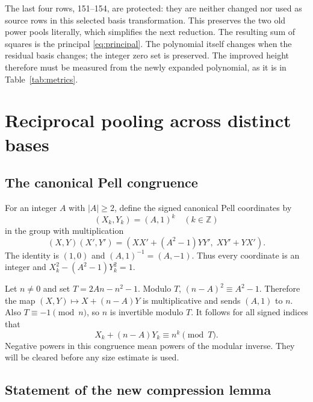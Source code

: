 \documentclass[11pt,letterpaper]{article}
\theoremstyle{definition}\newtheorem{definition}[theorem]{Definition}
\theoremstyle{remark}\newtheorem{remark}[theorem]{Remark}
\newcommand{\Z}{\mathbb Z}\newcommand{\N}{\mathbb N}
\begin{document}
The last four rows, 151--154, are protected: they are neither changed nor
used as source rows in this selected basis transformation. This preserves
the two old power pools literally, which simplifies the next reduction.
The resulting sum of squares is the principal \eqref{eq:principal}.
The polynomial itself changes when the residual basis changes; the
integer zero set is preserved. The improved height therefore must be
measured from the newly expanded polynomial, as it is in
Table~\ref{tab:metrics}.

\section{Reciprocal pooling across distinct bases}

\subsection{The canonical Pell congruence}

For an integer $A$ with $|A|\ge2$, define the signed canonical Pell
coordinates by
\[
 (X_k,Y_k)=(A,1)^k\quad(k\in\Z)
\]
in the group with multiplication
\[
 (X,Y)(X',Y')=(XX'+(A^2-1)YY',\;XY'+YX').
\]
The identity is $(1,0)$ and $(A,1)^{-1}=(A,-1)$.
Thus every coordinate is an integer and
$X_k^2-(A^2-1)Y_k^2=1$.

Let $n\ne0$ and set $T=2An-n^2-1$. Modulo $T$,
$(n-A)^2\equiv A^2-1$. Therefore the map
$(X,Y)\mapsto X+(n-A)Y$ is multiplicative and sends $(A,1)$ to $n$.
Also $T\equiv-1\pmod n$, so $n$ is invertible modulo $T$. It follows for
all signed indices that
\begin{equation}\label{eq:pellcongruence}
 X_k+(n-A)Y_k\equiv n^k\pmod T.
\end{equation}
Negative powers in this congruence mean powers of the modular inverse.
They will be cleared before any size estimate is used.

\subsection{Statement of the new compression lemma}
\end{document}
